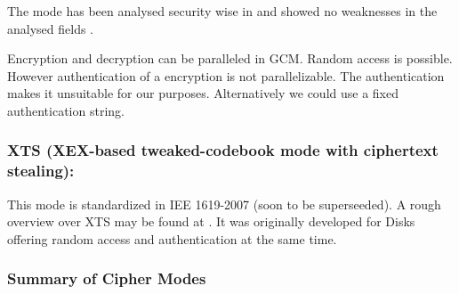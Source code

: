 The mode has been analysed security wise in \citeyear{mcgrew2004security} and showed no weaknesses in the analysed fields \cite{mcgrew2004security}. 

Encryption and decryption can be paralleled in GCM. Random access is possible. However authentication of a encryption is not parallelizable. The authentication makes it unsuitable for our purposes. Alternatively we could use a fixed authentication string.

\subsubsection{XTS (XEX-based tweaked-codebook mode with ciphertext stealing):} This mode is standardized in IEE 1619-2007 (soon to be superseeded). A rough overview over XTS may be found at \cite{Martin2010}. It was originally developed for Disks offering random access and authentication at the same time. 


\subsubsection{Summary of Cipher Modes}

